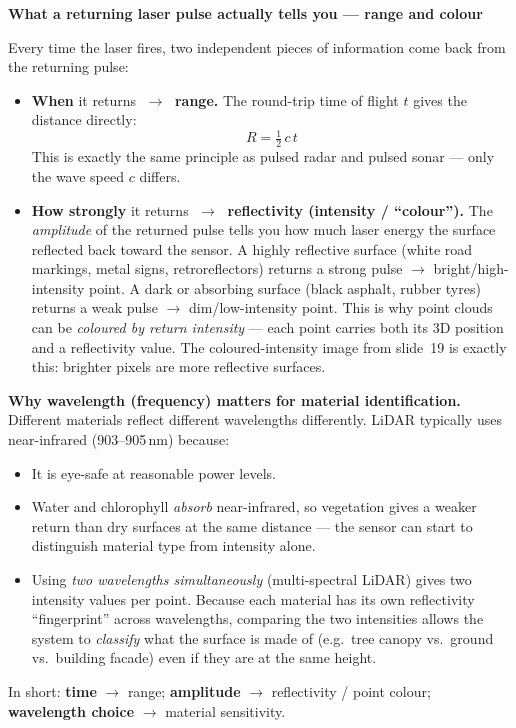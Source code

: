 \documentclass[12pt, a4paper]{article}
\begin{document}
\begin{notebox}
  \textbf{What a returning laser pulse actually tells you --- range and colour}

  Every time the laser fires, two independent pieces of information come back
  from the returning pulse:

  \begin{itemize}[leftmargin=1.2em,itemsep=3pt]
    \item \textbf{When} it returns $\;\to\;$ \textbf{range.}
      The round-trip time of flight $t$ gives the distance directly:
      \[
        R = \tfrac{1}{2}\,c\,t
      \]
      This is exactly the same principle as pulsed radar and pulsed sonar ---
      only the wave speed $c$ differs.

    \item \textbf{How strongly} it returns $\;\to\;$ \textbf{reflectivity
      (intensity / ``colour'').}
      The \emph{amplitude} of the returned pulse tells you how much laser
      energy the surface reflected back toward the sensor.
      A highly reflective surface (white road markings, metal signs,
      retroreflectors) returns a strong pulse $\to$ bright/high-intensity
      point.
      A dark or absorbing surface (black asphalt, rubber tyres) returns a weak
      pulse $\to$ dim/low-intensity point.
      This is why point clouds can be \emph{coloured by return intensity}
      --- each point carries both its 3D position and a reflectivity value.
      The coloured-intensity image from slide~19 is exactly this: brighter
      pixels are more reflective surfaces.
  \end{itemize}

  \textbf{Why wavelength (frequency) matters for material identification.}
  Different materials reflect different wavelengths differently.  LiDAR
  typically uses near-infrared (903--905\,nm) because:
  \begin{itemize}[leftmargin=1.2em,itemsep=2pt]
    \item It is eye-safe at reasonable power levels.
    \item Water and chlorophyll \emph{absorb} near-infrared, so vegetation
      gives a weaker return than dry surfaces at the same distance --- the
      sensor can start to distinguish material type from intensity alone.
    \item Using \emph{two wavelengths simultaneously} (multi-spectral LiDAR)
      gives two intensity values per point.  Because each material has its
      own reflectivity ``fingerprint'' across wavelengths, comparing the two
      intensities allows the system to \emph{classify} what the surface is
      made of (e.g.\ tree canopy vs.\ ground vs.\ building facade) even if
      they are at the same height.
  \end{itemize}

  In short: \textbf{time} $\to$ range;
  \textbf{amplitude} $\to$ reflectivity / point colour;
  \textbf{wavelength choice} $\to$ material sensitivity.
\end{notebox}
\end{document}
